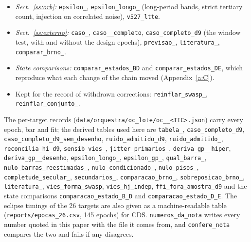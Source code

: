 \documentclass{aa}
\begin{document}
\begin{sloppypar}
\begin{itemize}
\item \textit{Sect.~\ref{ss:orb}:} \texttt{epsilon\_}, \texttt{epsilon\_\allowbreak longo\_} (long-period bands, strict tertiary count, injection on correlated noise), \texttt{v527\_\allowbreak ltte}.
\item \textit{Sect.~\ref{ss:externo}:} \texttt{caso\_}, \texttt{caso\_\_\allowbreak completo}, \texttt{caso\_\allowbreak completo\_\allowbreak d9} (the window test, with and without the design epochs), \texttt{previsao\_}, \texttt{literatura\_}, \texttt{comparar\_\allowbreak brno\_}.
\item \textit{State comparisons:} \texttt{comparar\_\allowbreak estados\_\allowbreak BD} and \texttt{comparar\_\allowbreak estados\_\allowbreak DE}, which reproduce what each change of the chain moved (Appendix~\ref{a:C}).
\item Kept for the record of withdrawn corrections: \texttt{reinflar\_\allowbreak swasp\_}, \texttt{reinflar\_\allowbreak conjunto\_}.
\end{itemize}

The per-target records (\texttt{data/orquestra/oc\_\allowbreak lote/oc\_\allowbreak \_\allowbreak <TIC>.json}) carry every epoch, bar and fit; the derived tables used here are \texttt{tabela\_}, \texttt{caso\_\allowbreak completo\_\allowbreak d9}, \texttt{caso\_\allowbreak completo\_\allowbreak d9\_\allowbreak sem\_\allowbreak desenho}, \texttt{ruido\_\allowbreak admitido\_\allowbreak d9}, \texttt{ruido\_\allowbreak admitido\_}, \texttt{reconcilia\_\allowbreak hi\_\allowbreak d9}, \texttt{sensib\_\allowbreak vies\_}, \texttt{jitter\_\allowbreak primarios\_}, \texttt{deriva\_\allowbreak gp\_\_\allowbreak hiper}, \texttt{deriva\_\allowbreak gp\_\_\allowbreak desenho}, \texttt{epsilon\_\allowbreak longo\_}, \texttt{epsilon\_\allowbreak gp\_}, \texttt{qual\_\allowbreak barra\_}, \texttt{nulo\_\allowbreak barras\_\allowbreak reestimadas\_}, \texttt{nulo\_\allowbreak condicionado\_}, \texttt{nulo\_\allowbreak pisos\_}, \texttt{completude\_\allowbreak secular\_}, \texttt{secundarios\_}, \texttt{comparacao\_\allowbreak brno\_}, \texttt{sobreposicao\_\allowbreak brno\_}, \texttt{literatura\_}, \texttt{vies\_\allowbreak forma\_\allowbreak swasp}, \texttt{vies\_\allowbreak hj\_\allowbreak indep}, \texttt{ffi\_\allowbreak fora\_\allowbreak amostra\_\allowbreak d9} and the state comparisons \texttt{comparacao\_\allowbreak estado\_\allowbreak B\_\allowbreak D} and \texttt{comparacao\_\allowbreak estado\_\allowbreak D\_\allowbreak E}. The eclipse timings of the 26 targets are also given as a machine-readable table (\texttt{reports/epocas\_\allowbreak 26.csv}, 145 epochs) for CDS. \texttt{numeros\_\allowbreak da\_\allowbreak nota} writes every number quoted in this paper with the file it comes from, and \texttt{confere\_\allowbreak nota} compares the two and fails if any disagrees.


\end{sloppypar}
\end{document}
